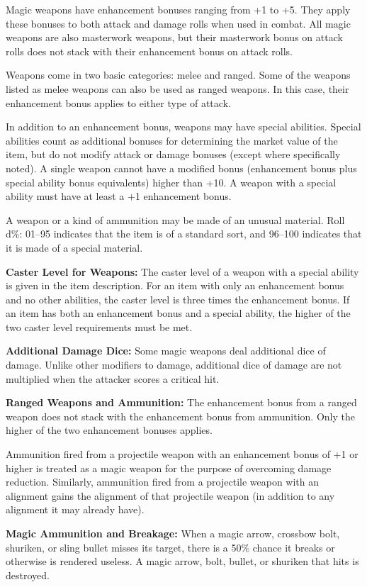 Magic weapons have enhancement bonuses ranging from +1 to +5. They apply these bonuses to both attack and damage rolls when used in combat. All magic weapons are also masterwork weapons, but their masterwork bonus on attack rolls does not stack with their enhancement bonus on attack rolls.

Weapons come in two basic categories: melee and ranged. Some of the weapons listed as melee weapons can also be used as ranged weapons. In this case, their enhancement bonus applies to either type of attack.

In addition to an enhancement bonus, weapons may have special abilities. Special abilities count as additional bonuses for determining the market value of the item, but do not modify attack or damage bonuses (except where specifically noted). A single weapon cannot have a modified bonus (enhancement bonus plus special ability bonus equivalents) higher than +10. A weapon with a special ability must have at least a +1 enhancement bonus.

A weapon or a kind of ammunition may be made of an unusual material. Roll d\%: 01--95 indicates that the item is of a standard sort, and 96--100 indicates that it is made of a special material.

\textbf{Caster Level for Weapons:} The caster level of a weapon with a special ability is given in the item description. For an item with only an enhancement bonus and no other abilities, the caster level is three times the enhancement bonus. If an item has both an enhancement bonus and a special ability, the higher of the two caster level requirements must be met.

\textbf{Additional Damage Dice:} Some magic weapons deal additional dice of damage. Unlike other modifiers to damage, additional dice of damage are not multiplied when the attacker scores a critical hit.

\textbf{Ranged Weapons and Ammunition:} The enhancement bonus from a ranged weapon does not stack with the enhancement bonus from ammunition. Only the higher of the two enhancement bonuses applies.

Ammunition fired from a projectile weapon with an enhancement bonus of +1 or higher is treated as a magic weapon for the purpose of overcoming damage reduction. Similarly, ammunition fired from a projectile weapon with an alignment gains the alignment of that projectile weapon (in addition to any alignment it may already have).

\textbf{Magic Ammunition and Breakage:} When a magic arrow, crossbow bolt, shuriken, or sling bullet misses its target, there is a 50\% chance it breaks or otherwise is rendered useless. A magic arrow, bolt, bullet, or shuriken that hits is destroyed.

